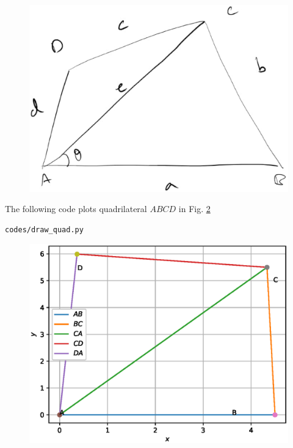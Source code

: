 \documentclass[journal,12pt,twocolumn]{IEEEtran}
\renewcommand\thesection{\arabic{section}}
\begin{document}
\begin{enumerate}[label=\thesection.\arabic*
,ref=\thesection.\theenumi]
\begin{figure}[!ht]
\includegraphics[width=\columnwidth]{./figs/quad_ex.eps}
\caption{}
\label{fig:quad_ex}
\end{figure}
The following code plots quadrilateral $ABCD$ in Fig. \ref{fig:quad}
\begin{lstlisting}
codes/draw_quad.py
\end{lstlisting}
\begin{figure}[!ht]
\includegraphics[width=\columnwidth]{./figs/quad.eps}
\caption{}
\label{fig:quad}
\end{figure}


\end{enumerate}
\end{document}
